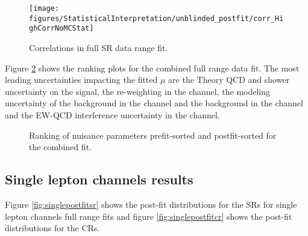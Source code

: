 \begin{figure}[h]
  \centering
  \texttt{[image: figures/StatisticalInterpretation/unblinded\_postfit/corr\_HighCorrNoMCStat]}
  \caption{Correlations in full SR data range fit.}
  \label{fig:corr}
\end{figure}

Figure \ref{fig:rankCombine} shows the ranking plots for the combined full range data fit. The most leading uncertainties impacting the fitted $\mu$ are the Theory QCD and shower uncertainty on the signal, the re-weighting in the \tlep channel, the modeling uncertainty of the \Zjets background in the \tlep channel and the \Wjets background in the \olep channel and the EW-QCD interference uncertainty in the \olep channel.

\begin{figure}[h]
  \centering
  \caption{Ranking of nuisance parameters prefit-sorted and postfit-sorted for the combined fit.}
  \label{fig:rankCombine}
\end{figure}

\subsection{Single lepton channels results}

Figure \ref{fig:singlepostfitsr} shows the post-fit distributions for the SRs for single lepton channels full range fits and figure \ref{fig:singlepostfitcr} shows the post-fit distributions for the CRs.

